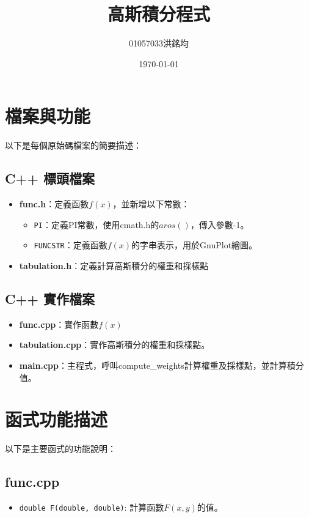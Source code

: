 \documentclass[a4paper,12pt]{article}
\title{高斯積分程式}
\author{01057033洪銘均}
\date{\today}
\begin{document}
\maketitle
\tableofcontents
\newpage



\section{檔案與功能}
以下是每個原始碼檔案的簡要描述：

\subsection{C++ 標頭檔案}
\begin{itemize}
    \item \textbf{func.h}：定義函數$f(x)$，並新增以下常數：
    \begin{itemize}
        \item \texttt{PI}：定義PI常數，使用cmath.h的$aros()$，傳入參數-1。
        \item \texttt{FUNCSTR}：定義函數$f(x)$的字串表示，用於GnuPlot繪圖。
    \end{itemize}
    \item \textbf{tabulation.h}：定義計算高斯積分的權重和採樣點

\end{itemize}

\subsection{C++ 實作檔案}
\begin{itemize} 
    \item \textbf{func.cpp}：實作函數$f(x)$
    \item \textbf{tabulation.cpp}：實作高斯積分的權重和採樣點。
    \item \textbf{main.cpp}：主程式，呼叫compute\_weights計算權重及採樣點，並計算積分值。
\end{itemize}

\section{函式功能描述}
以下是主要函式的功能說明：

\subsection{func.cpp}
\begin{itemize}
    \item \texttt{double F(double, double)}: 計算函數$F(x, y)$的值。
\end{itemize}
\end{document}

